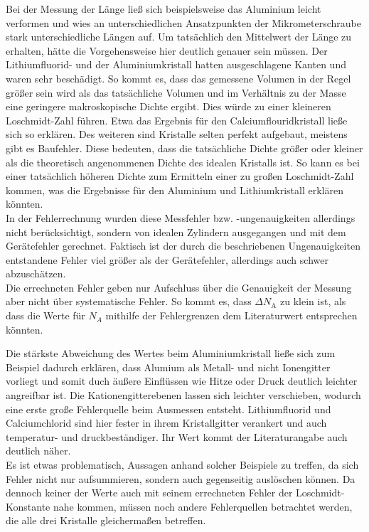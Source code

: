 \documentclass[12pt,a4paper,titlepage,headinclude,bibtotoc]{scrartcl}
\begin{document}
Bei der Messung der Länge ließ sich beispielsweise das Aluminium leicht verformen und wies an unterschiedlichen Ansatzpunkten der Mikrometerschraube stark unterschiedliche Längen auf. Um tatsächlich den Mittelwert der Länge zu erhalten, hätte die Vorgehensweise hier deutlich genauer sein müssen. Der Lithiumfluorid- und der Aluminiumkristall hatten ausgeschlagene Kanten und waren sehr beschädigt. So kommt es, dass das gemessene Volumen in der Regel größer sein wird als das tatsächliche Volumen und im Verhältnis zu der Masse eine geringere makroskopische Dichte ergibt. Dies würde zu einer kleineren Loschmidt-Zahl führen. Etwa das Ergebnis für den Calciumflouridkristall ließe sich so erklären. Des weiteren sind Kristalle selten perfekt aufgebaut, meistens gibt es Baufehler. Diese bedeuten, dass die tatsächliche Dichte größer oder kleiner als die theoretisch angenommenen Dichte des idealen Kristalls ist. So kann es bei einer tatsächlich höheren Dichte zum Ermitteln einer zu großen Loschmidt-Zahl kommen, was die Ergebnisse für den Aluminium und Lithiumkristall erklären könnten.\\

In der Fehlerrechnung wurden diese Messfehler bzw. -ungenauigkeiten allerdings nicht berücksichtigt, sondern von idealen Zylindern ausgegangen und mit dem Gerätefehler gerechnet. Faktisch ist der durch die beschriebenen Ungenauigkeiten entstandene Fehler viel größer als der Gerätefehler, allerdings auch schwer abzuschätzen. \\
Die errechneten Fehler geben nur Aufschluss über die Genauigkeit der Messung aber nicht über systematische Fehler. So kommt es, dass $\Delta N_\mathrm{A}$ zu klein ist, als dass die Werte für $N_A$ mithilfe der Fehlergrenzen dem Literaturwert entsprechen könnten.

Die stärkste Abweichung des Wertes beim Aluminiumkristall ließe sich zum Beispiel dadurch erklären, dass Alumium als Metall- und nicht Ionengitter vorliegt und somit duch äußere Einflüssen wie Hitze oder Druck deutlich leichter angreifbar ist. Die Kationengitterebenen lassen sich leichter verschieben, wodurch eine erste große Fehlerquelle beim Ausmessen entsteht. Lithiumfluorid und Calciumchlorid sind hier fester in ihrem Kristallgitter verankert und auch temperatur- und druckbeständiger. Ihr Wert kommt der Literaturangabe auch deutlich näher. \\
Es ist etwas problematisch, Aussagen anhand solcher Beispiele zu treffen, da sich Fehler nicht nur aufsummieren, sondern auch gegenseitig auslöschen können. Da dennoch keiner der Werte auch mit seinem errechneten Fehler der Loschmidt-Konstante nahe kommen, müssen noch andere Fehlerquellen betrachtet werden, die alle drei Kristalle gleichermaßen betreffen.
\end{document}
